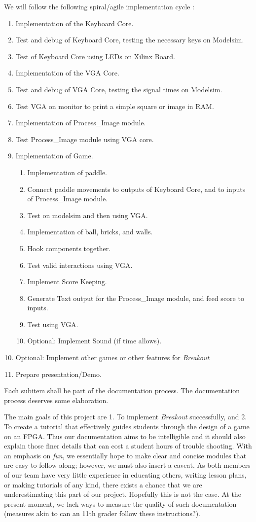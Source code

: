 \documentclass[conference]{IEEEtran}
\begin{document}
We will follow the following spiral/agile implementation cycle :
\begin{enumerate}
\item Implementation of the Keyboard Core.
\item Test and debug of Keyboard Core, testing the necessary keys on Modelsim.
\item Test of Keyboard Core using LEDs on Xilinx Board.
\item Implementation of the VGA Core.
\item Test and debug of VGA Core, testing the signal times on Modelsim.
\item Test VGA on monitor to print a simple square or image in RAM.
\item Implementation of Process\_Image module.
\item Test Process\_Image module using VGA core.
\item Implementation of Game.
\begin{enumerate}
\item Implementation of paddle.
\item Connect paddle movements to outputs of Keyboard Core, and to inputs of Process\_Image module.
\item Test on modelsim and then using VGA.
\item Implementation of ball, bricks, and walls.
\item Hook components together.
\item Test valid interactions using VGA.
\item Implement Score Keeping.
\item Generate Text output for the Process\_Image module, and feed score to inputs.
\item Test using VGA.
\item Optional: Implement Sound (if time allows).
\end{enumerate}
\item Optional: Implement other games or other features for \emph{Breakout}
\item Prepare presentation/Demo.
\end{enumerate}

Each subitem shall be part of the documentation process. The documentation process deserves some elaboration.

The main goals of this project are 1. To implement \emph{Breakout} successfully, and 2. To create a tutorial that effectively guides students through the design of a game on an FPGA. Thus our documentation aims to be intelligible and it should also explain those finer details that can cost a student hours of trouble shooting. With an emphasis on \emph{fun}, we essentially hope to make clear and concise modules that are easy to follow along; however, we must also insert a caveat. As both members of our team have very little experience in educating others, writing lesson plans, or making tutorials of any kind, there exists a chance that we are underestimating this part of our project. Hopefully this is not the case. At the present moment, we lack ways to measure the quality of such documentation (measures akin to can an 11th grader follow these instructions?).
\end{document}
